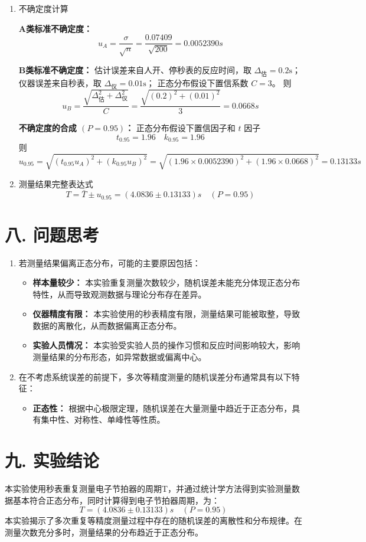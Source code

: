\documentclass[12pt,a4paper]{article}
\begin{document}
\begin{enumerate}
		\item 不确定度计算
	
		\textbf{A类标准不确定度：}
			$$u_{A}=\frac{\sigma}{\sqrt{n}}=\frac{0.07409}{\sqrt{200}}=0.0052390s$$
		
		\textbf{B类标准不确定度：}
			估计误差来自人开、停秒表的反应时间，取 $\Delta_{\text{估}} = 0.2\mathrm{s}$；
			仪器误差来自秒表，取 $\Delta_{\text{仪}} = 0.01\mathrm{s}$；
			正态分布假设下置信系数 $C=3$。
			则 \[u_B=\dfrac{\sqrt{\Delta_{\text{估}}^2+\Delta_{\text{仪}}^2}}{C}=\frac{\sqrt{(0.2)^{2}+(0.01)^{2}}}{3}=0.0668s\]

		\textbf{不确定度的合成 $(P=0.95)$：}
			正态分布假设下置信因子和 $t$ 因子
			$$t_{0.95}=1.96 \quad k_{0.95}=1.96$$
			则
			$$u_{0.95}=\sqrt{(t_{0.95}u_{A})^{2}+(k_{0.95}u_{B})^{2}}=\sqrt{(1.96\times0.0052390)^{2}+(1.96\times0.0668)^{2}}=0.13133s$$

		\item 测量结果完整表达式
		$$T=\bar{T}\pm u_{0.95} = (4.0836\pm0.13133)s\quad(P=0.95)$$
	
	\end{enumerate}

	\section*{\textbf{{八. 问题思考}}}
	\begin{enumerate}[leftmargin=2em, label=\arabic*.]
		\item 若测量结果偏离正态分布，可能的主要原因包括：
		\begin{itemize}
			\item \textbf{样本量较少：} 本实验重复测量次数较少，随机误差未能充分体现正态分布特性，从而导致观测数据与理论分布存在差异。
			\item \textbf{仪器精度有限：} 本实验使用的秒表精度有限，测量结果可能被取整，导致数据的离散化，从而数据偏离正态分布。
			\item \textbf{实验人员情况：} 本实验受实验人员的操作习惯和反应时间影响较大，影响测量结果的分布形态，如异常数据或偏离中心。
		\end{itemize}
	
		\item 在不考虑系统误差的前提下，多次等精度测量的随机误差分布通常具有以下特征：
		\begin{itemize}
			\item \textbf{正态性：} 根据中心极限定理，随机误差在大量测量中趋近于正态分布，具有集中性、对称性、单峰性等性质。
		\end{itemize}
	\end{enumerate}
	
	\section*{\textbf{{九. 实验结论}}}
	本实验使用秒表重复测量电子节拍器的周期T，并通过统计学方法得到实验测量数据基本符合正态分布，同时计算得到电子节拍器周期，为：
	$$T= (4.0836\pm0.13133)s\quad(P=0.95)$$
	本实验揭示了多次重复等精度测量过程中存在的随机误差的离散性和分布规律。在测量次数充分多时，测量结果的分布趋近于正态分布。
	
\end{document}
